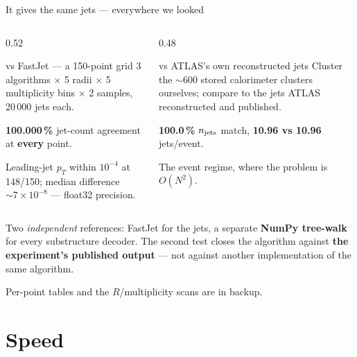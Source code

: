 \documentclass[aspectratio=169,10pt]{beamer}
\newcommand{\smallnote}[1]{{\footnotesize\color{fjgray} #1}}
\newcommand{\realC}{{\footnotesize\normalfont\textcolor{white}{[ATLAS Open Data]}}}
\begin{document}
\begin{frame}{It gives the same jets --- everywhere we looked \hfill \realC}
\begin{columns}[T]
\begin{column}{0.52\textwidth}
\begin{block}{vs FastJet --- a 150-point grid}
\small 3 algorithms $\times$ 5 radii $\times$ 5 multiplicity bins $\times$ 2
samples, 20\,000 jets each.
\smallskip

\textbf{100.000\,\%} jet-count agreement at \textbf{every} point.
\end{block}
\smallnote{Leading-jet $p_T$ within $10^{-4}$ at 148/150; median difference
$\sim7\times10^{-8}$ --- float32 precision.}
\end{column}
\begin{column}{0.48\textwidth}
\begin{block}{vs ATLAS's own reconstructed jets}
\small Cluster the $\sim$600 stored calorimeter clusters ourselves; compare to
the jets ATLAS reconstructed and published.
\smallskip

\textbf{100.0\,\%} $n_{\rm jets}$ match, \textbf{10.96 vs 10.96} jets/event.
\end{block}
\smallnote{The event regime, where the problem is $O(N^2)$.}
\end{column}
\end{columns}
\vspace{0.3em}

\begin{block}{}
\small Two \emph{independent} references: FastJet for the jets, a separate
\textbf{NumPy tree-walk} for every substructure decoder. The second test closes
the algorithm against \textbf{the experiment's published output} --- not against
another implementation of the same algorithm.
\end{block}
\smallnote{Per-point tables and the $R$/multiplicity scans are in backup.}
\end{frame}

\section{Speed}
\end{document}
